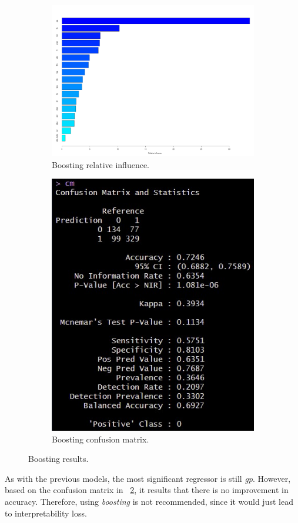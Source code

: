 \begin{figure}[H]
	\centering
	\begin{subfigure}{.5\textwidth}
		\centering
		\includegraphics[width=0.6\linewidth]{ImageFiles/Classification/Trees/boost_4_rel_inf}
		\caption{Boosting relative influence.}
		\label{fig:boost_4_rel_inf}
	\end{subfigure}%
	\hfill
	\begin{subfigure}{.5\textwidth}
		\centering
		\includegraphics[width=0.4\linewidth]{ImageFiles/Classification/Trees/boost_4_conf_mat}
		\caption{Boosting confusion matrix.}
		\label{fig:boost_4_conf_mat}
	\end{subfigure}
	\caption{Boosting results.}
	\label{BoostRes}
\end{figure}

As with the previous models, the most significant regressor is still \textit{gp}. However, based on the confusion matrix in \Fig~\ref{fig:boost_4_conf_mat}, it results that there is no improvement in accuracy. Therefore, using \textit{boosting} is not recommended, since it would just lead to interpretability loss.

